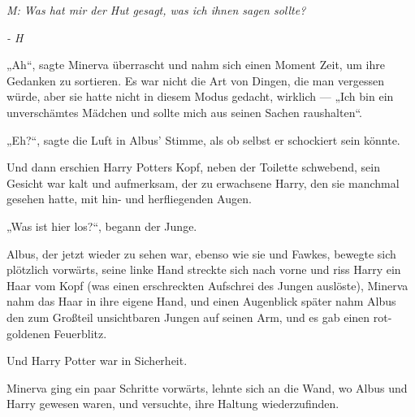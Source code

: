 \emph{M: Was hat mir der Hut gesagt, was ich ihnen sagen sollte?}

\emph{- H}

„Ah“, sagte Minerva überrascht und nahm sich einen Moment Zeit, um ihre Gedanken zu sortieren. Es war nicht die Art von Dingen, die man vergessen würde, aber sie hatte nicht in diesem Modus gedacht, wirklich —
„Ich bin ein unverschämtes Mädchen und sollte mich aus seinen Sachen raushalten“.

„Eh?“, sagte die Luft in Albus’ Stimme, als ob selbst er schockiert sein könnte.

Und dann erschien Harry Potters Kopf, neben der Toilette schwebend, sein Gesicht war kalt und aufmerksam, der zu erwachsene Harry, den sie manchmal gesehen hatte, mit hin- und herfliegenden Augen.

„Was ist hier los?“, begann der Junge.

Albus, der jetzt wieder zu sehen war, ebenso wie sie und Fawkes, bewegte sich plötzlich vorwärts, seine linke Hand streckte sich nach vorne und riss Harry ein Haar vom Kopf (was einen erschreckten Aufschrei des Jungen auslöste), Minerva nahm das Haar in ihre eigene Hand, und einen Augenblick später nahm Albus den zum Großteil unsichtbaren Jungen auf seinen Arm, und es gab einen rot-goldenen Feuerblitz.

Und Harry Potter war in Sicherheit.

Minerva ging ein paar Schritte vorwärts, lehnte sich an die Wand, wo Albus und Harry gewesen waren, und versuchte, ihre Haltung wiederzufinden.

